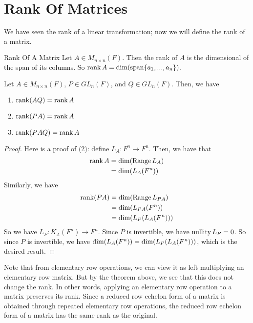 \documentclass[main.tex]{subfiles}
\begin{document}
    \section{Rank Of Matrices}
    We have seen the rank of a linear transformation; now we will define the rank of a matrix. 
    \begin{defn}{Rank Of A Matrix}{}
        Let $A\in M_{n\times n}(F)$. Then the rank of $A$ is the dimensional of the span of its columns. So $\operatorname{rank} A = \operatorname{dim} (\operatorname{span} \{a_1, ..., a_n\})$. 
    \end{defn}
    \begin{thrm}{}{}
        Let $A\in M_{n\times n}(F)$, $P\in GL_n(F)$, and $Q\in GL_n(F)$. Then, we have 
        \begin{enumerate}
            \item $\operatorname{rank} (AQ) = \operatorname{rank} A$
            \item $\operatorname{rank} (PA) = \operatorname{rank} A$
            \item $\operatorname{rank} (PAQ) = \operatorname{rank} A$
        \end{enumerate}
    \end{thrm}
    \begin{proof}
        Here is a proof of (2): define $L_A: F^n \to F^n$. Then, we have that 
        \begin{align*}
            \operatorname{rank} A &= \operatorname{dim} (\operatorname{Range} L_A) \\
            &= \operatorname{dim} (L_A (F^n))
        \end{align*}
        Similarly, we have 
        \begin{align*}
            \operatorname{rank} (PA) &= \operatorname{dim} (\operatorname{Range} L_{PA}) \\
            &= \operatorname{dim} (L_{PA}(F^n)) \\
            &= \operatorname{dim} (L_P(L_A(F^n)))
        \end{align*}
        So we have $L_P: K_A(F^n) \to F^n$. Since $P$ is invertible, we have $\operatorname{nullity} L_P = 0$. So since $P$ is invertible, we have $\operatorname{dim} (L_A(F^n)) = \operatorname{dim} (L_P(L_A(F^n)))$, which is the desired result.
    \end{proof}
    Note that from elementary row operations, we can view it as left multiplying an elementary row matrix. But by the theorem above, we see that this does not change the rank. In other words, applying an elementary row operation to a matrix preserves its rank. Since a reduced row echelon form of a matrix is obtained through repeated elementary row operations, the reduced row echelon form of a matrix has the same rank as the original. 
\end{document}
